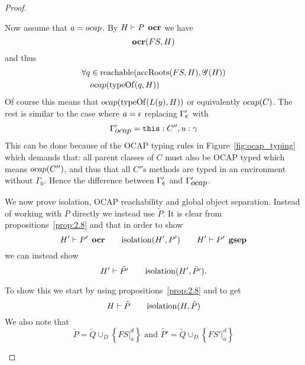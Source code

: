 \begin{proof}
\begin{description}
\begin{description}
          Now assume that $a = \mbox{$ocap$}$. By $H \vdash P \:\: \mbox{\bf ocr}$ we have
          \begin{equation}
            \mbox{\bf ocr}(FS, H)
          \end{equation}
          and thus
          \begin{equation}
            \begin{aligned}
              \forall q &\in \mbox{$\mathrm{reachable}$}(\mbox{$\mathrm{accRoots}$}(FS, H), \mathscr{G}(H)) \\
              & \mbox{$ocap$}(\mbox{$\mathrm{typeOf}$}(q, H))
            \end{aligned}
          \end{equation}
          Of course this means that $\mbox{$ocap$}(\mbox{$\mathrm{typeOf}$}(L(y), H))$ or equivalently
          $\mbox{$ocap$}(C)$. The rest is similar to the case where $a = \mbox{$\epsilon$}$
          replacing $\Gamma_{\mbox{$\epsilon$}}'$ with 
          \begin{equation}
            \Gamma'_{\mbox{$ocap$}} = \mbox{\texttt{this}}: C'', u: \gamma
          \end{equation}
          This can be done because of the OCAP typing rules in
          Figure~\ref{fig:ocap_typing} which demands that: all parent classes of
          $C$ must also be OCAP typed which means $\mbox{$ocap$}(C'')$, and thus that
          all $C''$s methods are typed in an environment without $\Gamma_0$.
          Hence the difference between $\Gamma'_{\mbox{$\epsilon$}}$ and $\Gamma'_{\mbox{$ocap$}}$.


          We now prove isolation, OCAP reachability and global object
          separation. Instead of working with $P$ directly we instead use
          $\tilde{P}$. It is clear from propositions~\ref{prop:2.8} and %
          that in order to show 
          \begin{equation}
            H' \vdash P' \:\: \mbox{\bf ocr} \quad\quad \mbox{$\mathrm{isolation}$}(H', P') \quad\quad H'
            \vdash P' \:\: \mbox{\bf gsep}
          \end{equation}
          we can instead show
          \begin{equation}
            H' \vdash \tilde{P'} \quad\quad \mbox{$\mathrm{isolation}$}(H', \tilde{P'}).
          \end{equation}

          To show this we start by using propositions~\ref{prop:2.8} and %
          to get
          \begin{equation}
            H \vdash \tilde{P} \quad\quad \mbox{$\mathrm{isolation}$}(H, \tilde{P})
          \end{equation}
          We also note that 
          \begin{equation}
            \tilde{P} = \tilde{Q} \cup_D \left\{ FS|_a^d \right\} \text{ and }
            \tilde{P'} = \tilde{Q} \cup_D \left\{ FS'|_a^d \right\} 
          \end{equation}


\end{description}
\end{description}
\end{proof}
